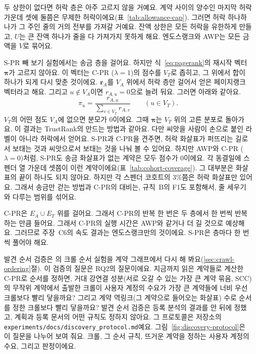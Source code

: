 두 상한이 없다면 허락 층은 아주 고르지 않을 거예요. 계약 사이의 양수인 마지막 허락 가운데 셋에 둘쯤은 무제한 허락이에요(표~\ref{tab:allowance-cap}). 그러면 허락 하나하나가 그 주인 줄의 거의 전부를 가져갈 거예요. 잔액 상한은 모든 허락을 유한하게 만들고, $U$는 큰 잔액 하나가 줄을 다 가져가지 못하게 해요. 엔도스랭크와 AWP는 모든 금액을 $V$로 묶어요.

\mbox{S-PR} 빼 보기 실험에서는 송금 층을 걸어요. 하지만 식~\eqref{eq:pagerank}의 재시작 벡터 $\boldsymbol{\pi}$가 고르지 않아요. 이 벡터는 \mbox{C-PR} ($\lambda=1$)의 점수를 $V_T$로 좁히고, 그 위에서 합이 하나가 되게 다시 맞춘 것이에요. $\mathbf{r}_{A}$를 $V_A$ 위에서 허락 층만 걸어서 얻은 페이지랭크 벡터라고 해요. 그리고 $u\notin V_A$이면 $r_{A,u}=0$으로 늘려 둬요. 그러면 아래와 같아요.
\[
\pi_u=\frac{r_{A,u}}{\sum_{v\in V_T} r_{A,v}}\qquad(u\in V_T).
\]
$V_T$의 어떤 점도 $V_A$에 없으면 분모가 0이에요. 그때 $\boldsymbol{\pi}$는 $V_T$ 위의 고른 분포로 돌아가요. 이 결과는 TrustRank의 만드는 방법과 같아요\parencite{gyongyi2004trustrank}. 다만 씨앗을 사람이 손으로 붙인 라벨이 아니라 허락에서 얻어요. \mbox{S-PR}과 \mbox{C-PR}을 견주면, 허락 화살표가 퍼뜨리는 길로서 보태는 것과 씨앗으로서 보태는 것을 나눠 볼 수 있어요. 하지만 AWP와 \mbox{C-PR} ($\lambda=0$)처럼, \mbox{S-PR}도 송금 화살표가 없는 계약은 모두 점수가 0이에요. 각 동결일에 스펜더 열 가운데 셋쯤이 이런 계약이에요(표~\ref{tab:cohort-coverage}). 그 대부분은 화살표의 끝이 하나도 되지 않아요. 하지만 각 스펜더 코호트의 $3\%$쯤은 허락 화살표만 있어요. 그래서 송금만 걷는 방법과 \mbox{C-PR}의 대비는, 규칙~B의 F1도 포함해서, 줄 세우기와 다루는 범위를 섞어요.

\mbox{C-PR}은 $E_A\cup E_T$ 위를 걸어요. 그래서 \mbox{C-PR}의 반복 한 번은 두 층에서 한 번씩 반복하는 만큼 들어요. 그래서 \mbox{C-PR}의 실행 시간은 AWP와 같거나 더 길 것으로 예상해요. 그러므로 주장~C6의 속도 결과는 엔도스랭크만의 것이에요. \mbox{S-PR}은 층마다 한 번씩 풀어야 해요.


발견 순서 검증은 \textcite{cho1998crawling}의 크롤 순서 실험을 계약 그래프에서 다시 해 봐요(\ref{sec:crawl-ordering}절). 이 검증의 질문은 RQ2의 질문이에요. 지금까지 읽은 계약들로 계산한 \mbox{C-PR}로 순서를 정하면, 거대 강연결 성분(서로 오갈 수 있는 가장 큰 계약 묶음, SCC)의 무작위 계약에서 출발한 크롤이 사용자 계정의 수요가 가장 큰 계약들에 너비 우선 크롤보다 빨리 닿을까요? 그리고 계약 역링크(그 계약으로 들어오는 화살표) 수로 순서를 정한 크롤보다 빨리 닿을까요? 발견 순서 검증은 등록 분석의 결과를 안 뒤에 정했고, 계획과 등록 문서의 어떤 규칙도 정하지 않아요. 그 프로토콜은 저장소의 \texttt{experiments/docs/discovery\_protocol.md}예요. 그림~\ref{fig:discovery-protocol}은 이 질문을 나누어 보여 줘요. 크롤, 그 순서 규칙, 뜨거운 계약을 정하는 사용자 계정의 수요, 그리고 판정이에요.

